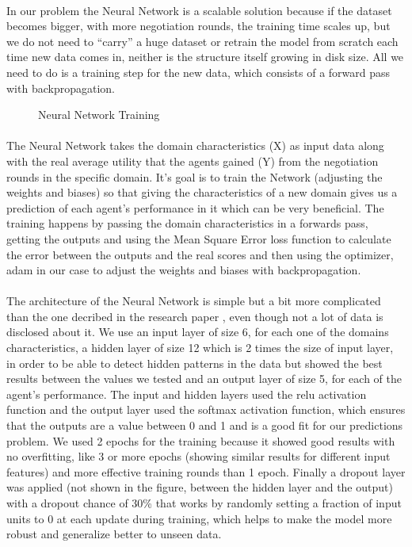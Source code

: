  \paragraph{}
 In our problem the Neural Network 
 is a scalable solution because if the dataset becomes bigger, with more negotiation rounds, 
 the training time scales up, but we do not need to “carry” a huge dataset or retrain the model from scratch each time new data comes in, 
  neither is the structure itself growing in disk size. All we need to do is a training step for the new data, which consists of a forward pass with backpropagation.
\begin{figure}[H]
\centering
\captionsetup{justification=centering}
\caption{Neural Network Training}
\label{fig:NeuralNetworkTraining}
\end{figure}


\paragraph{}
 The Neural Network takes the domain characteristics (X) as input data along with the real average utility that the agents gained (Y) from the negotiation rounds in the specific domain. It’s goal is to train the Network (adjusting the weights and biases) so that giving the characteristics of a new domain gives us a prediction of each agent’s performance in it which can be very beneficial.  
 The training happens by passing the domain characteristics in a forwards pass, getting the outputs and using the Mean Square Error loss function to calculate the error between the outputs and the real scores and then using the optimizer, adam in our case to adjust the weights and biases with backpropagation.
 \paragraph{}
 

The architecture of the Neural Network is simple but a bit more complicated than the one decribed in the research paper \cite{meta_agent_paper}, even though not a lot of data is disclosed about it.
 We use an input layer of size 6, for each one of the domains characteristics, 
 a hidden layer of size 12 which is 2 times the size of input layer, in order to be able to detect hidden patterns in the data but showed 
 the best results between the values we tested and an output layer of size 5, for each of the agent's performance.  
 The input and hidden layers used the relu activation function and the output layer used the softmax activation function, which ensures that the outputs are a value between 0 and 1 and is a good fit for our predictions problem. We used 2 epochs for the training because it showed good results with no overfitting, like 3 or more epochs (showing similar results for different input features) and
  more effective training rounds than 1 epoch. Finally a dropout layer was applied (not shown in the figure, between the hidden layer and the output) with a dropout chance of 30\% that works by 
  randomly setting a fraction of input units to 0 at each update during training, which helps to make the model more robust and generalize better to unseen data. 
